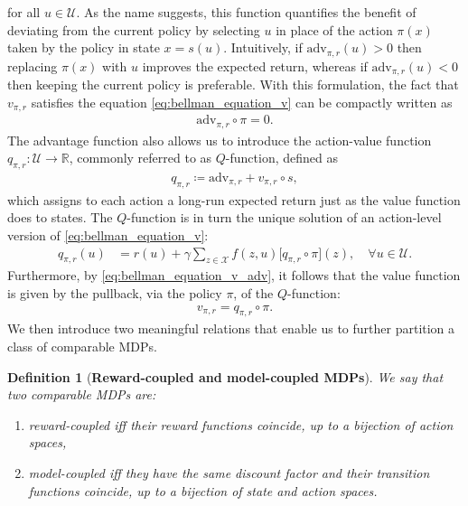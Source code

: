 \documentclass[10pt,leqno]{amsart}
\newcommand{\R}{\mathbb{R}}
\newcommand{\U}{\mathcal{U}}
\newcommand{\X}{\mathcal{X}}
\newcommand{\cost}{r}
\newcommand{\vv}{v_{\policy, \cost}}
\newcommand{\q}{q_{\policy, \cost}}
\newcommand{\f}{f}
\newcommand{\policy}{\pi}
\newcommand{\state}{x} %
\newcommand{\act}{u}   %
\newcommand{\disc}{\gamma}
\newcommand{\proj}{s}
\newcommand{\advsym}{\text{adv}}
\newcommand{\adv}[2]{\advsym_{#1, #2}}
\newtheorem{definition}[theorem]{Definition}
\begin{document}
for all $\act \in \U$. As the name suggests, this function quantifies the benefit of deviating from the current policy by selecting $\act$ in place of the action $\policy(\state)$ taken by the policy in state $\state = \proj(\act)$. Intuitively, if $\adv{\policy}{\cost}(\act) > 0$ then replacing $\policy(\state)$ with $\act$ improves the expected return, whereas if $\adv{\policy}{\cost}(\act) < 0$ then keeping the current policy is preferable. With this formulation, the fact that $\vv$ satisfies the equation \eqref{eq:bellman_equation_v} can be compactly written as 
\begin{align}\label{eq:bellman_equation_v_adv}
    \adv{\policy}{\cost} \circ \policy = 0.
\end{align}
The advantage function also allows us to introduce the action-value function $\q : \U \to \R$, commonly referred to as $Q$-function, defined as
\begin{align}
    \q \coloneqq \adv{\policy}{\cost} + \vv \circ \proj,
\end{align}
which assigns to each action a long-run expected return just as the value function does to states. The $Q$-function is in turn the unique solution of an action-level version of \eqref{eq:bellman_equation_v}:
\begin{align}\label{eq:bellman_q_fun}
    \q(\act) &= \cost(\act) + \disc \sum_{z \in \X} \f(z, \act) \bigl[\q \circ \policy\bigr](z), \quad \forall \act \in \U.
\end{align}
Furthermore, by \eqref{eq:bellman_equation_v_adv}, it follows that the value function is given by the pullback, via the policy $\policy$, of the $Q$-function:
\begin{align*}
    \vv = \q \circ \policy.
\end{align*}
\noindent
We then introduce two meaningful relations that enable us to further partition a class of comparable MDPs.
\begin{definition}[\textbf{Reward-coupled and model-coupled MDPs}]
    We say that two comparable MDPs are:
    \begin{enumerate}[label=$\rhd$]
        \item reward-coupled iff their reward functions coincide, up to a bijection of action spaces,
        \item model-coupled iff they have the same discount factor and their transition functions coincide, up to a bijection of state and action spaces.
    \end{enumerate}
\end{definition}
\end{document}
